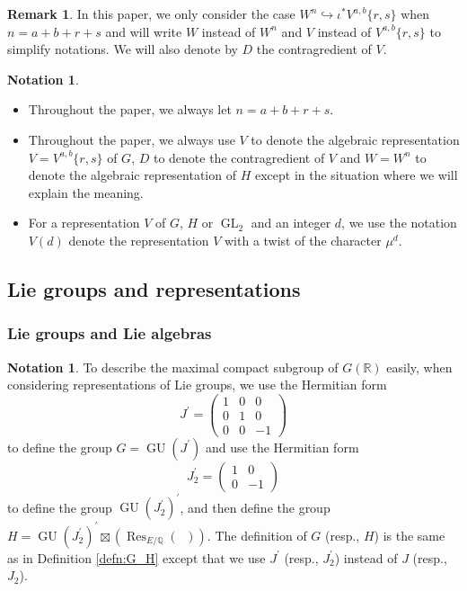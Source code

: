 \documentclass[11pt, a4paper]{amsart}
\theoremstyle{plain}
\theoremstyle{definition}
\newtheorem{remark}[theorem]{Remark}
\newtheorem{notation}[theorem]{Notation}
\numberwithin{equation}{section}
\def\QQ{\mathbb{Q}}
\def\RR{\mathbb{R}}
\DeclareMathOperator{\Res}{Res}
\DeclareMathOperator{\GU}{GU}
\DeclareMathOperator{\GL}{\mathrm{GL}}
\DeclareMathOperator{\Gm}{\mathrm{G_{m}}}
\begin{document}
\begin{remark}
In this paper, we only consider the case $W^{n} \hookrightarrow \iota^{*} V^{a, b}\{r, s\}$ when $n = a + b + r + s$ and will write $W$ instead of $W^{n}$ and $V$ instead of $V^{a,b} \{r, s\}$ to simplify notations. We will also denote by $D$ the contragredient of $V$. 
\end{remark}

\begin{notation}
    \begin{itemize}
        \item Throughout the paper, we always let $n = a + b + r + s$. 
        \item Throughout the paper, we always use $V$ to denote the algebraic representation $V = V^{a, b} \{r, s\}$ of $G$, $D$ to denote the contragredient of $V$ and $W = W^{n}$ to denote the algebraic representation of $H$ except in the situation where we will explain the meaning. 
        \item For a representation $V$ of $G$, $H$ or $\GL_2$ and an integer $d$, we use the notation $V(d)$ denote the representation $V$ with a twist of the character $\mu^{d}$. 
    \end{itemize}
   
\end{notation}

\subsection{Lie groups and representations}
\label{SS: Lie groups}
\subsubsection{Lie groups and Lie algebras}
\begin{notation}
To describe the maximal compact subgroup of $G(\RR)$ easily, when considering representations of Lie groups, we use the Hermitian form 
\begin{equation*}
    J^{\prime} = \begin{pmatrix}
                    1 & 0 & 0 \\
                    0 & 1 & 0 \\
                    0 & 0 & -1 
                 \end{pmatrix} 
\end{equation*}
to define the group $G = \GU(J^{\prime})$ and use the Hermitian form 
\begin{equation*}
    J_2^{\prime} = \begin{pmatrix}
                    1 & 0 \\
                    0 & -1 
                 \end{pmatrix} 
\end{equation*}
to define the group $\GU(J_2^{\prime})^{\prime}$, and then define the group $H = \GU(J_2^{\prime})^{\prime} \boxtimes (\Res_{E/\QQ}(\Gm))$. 
The definition of $G$ (resp., $H$) is the same as in Definition \ref{defn:G_H} except that we use $J^{\prime}$ (resp., $J^{\prime}_{2}$) instead of $J$ (resp., $J_{2}$).
\end{notation}
\end{document}
